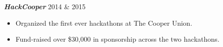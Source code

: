 \documentclass[overlapped]{res}
\begin{document}
\begin{resume}

    {\bf {\em HackCooper\/}} \hfill 2014 \& 2015
    \begin{itemize} \itemsep-2pt
        \item
            Organized the first ever hackathons at The Cooper Union.
        \item
            Fund-raised over \$30,000 in sponsorship across the two hackathons.
    \end{itemize}




\end{resume}
\end{document}

